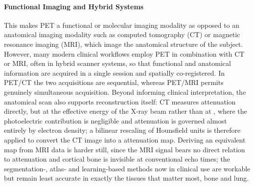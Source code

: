 \paragraph{Functional Imaging and Hybrid Systems}
This makes PET a functional or molecular imaging modality as opposed to an anatomical imaging modality such as computed tomography (CT) or magnetic resonance imaging (MRI), which image the anatomical structure of the subject.
However, many modern clinical workflows employ PET in combination with CT or MRI, often in hybrid scanner systems, so that functional and anatomical information are acquired in a single session and spatially co-registered.
In PET/CT the two acquisitions are sequential, whereas PET/MRI permits genuinely simultaneous acquisition.
Beyond informing clinical interpretation, the anatomical scan also supports reconstruction itself: CT measures attenuation directly, but at the effective energy of the X-ray beam rather than at , where the photoelectric contribution is negligible and attenuation is governed almost entirely by electron density; a bilinear rescaling of Hounsfield units is therefore applied to convert the CT image into a  attenuation map.
Deriving an equivalent map from MRI data is harder still, since the MRI signal bears no direct relation to attenuation and cortical bone is invisible at conventional echo times; the segmentation-, atlas- and learning-based methods now in clinical use are workable but remain least accurate in exactly the tissues that matter most, bone and lung.

